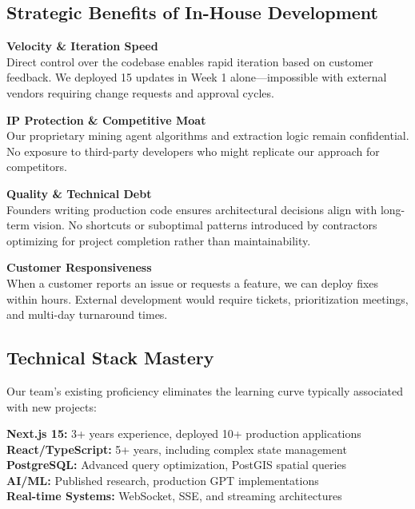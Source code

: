\documentclass[11pt]{article}
\begin{document}
\subsection{Strategic Benefits of In-House Development}

\textbf{Velocity \& Iteration Speed}\\
Direct control over the codebase enables rapid iteration based on customer feedback. We deployed 15 updates in Week 1 alone—impossible with external vendors requiring change requests and approval cycles.

\textbf{IP Protection \& Competitive Moat}\\
Our proprietary mining agent algorithms and extraction logic remain confidential. No exposure to third-party developers who might replicate our approach for competitors.

\textbf{Quality \& Technical Debt}\\
Founders writing production code ensures architectural decisions align with long-term vision. No shortcuts or suboptimal patterns introduced by contractors optimizing for project completion rather than maintainability.

\textbf{Customer Responsiveness}\\
When a customer reports an issue or requests a feature, we can deploy fixes within hours. External development would require tickets, prioritization meetings, and multi-day turnaround times.

\subsection{Technical Stack Mastery}

Our team's existing proficiency eliminates the learning curve typically associated with new projects:

\begin{highlight}
\faCheckCircle \quad \textbf{Next.js 15:} 3+ years experience, deployed 10+ production applications\\
\faCheckCircle \quad \textbf{React/TypeScript:} 5+ years, including complex state management\\
\faCheckCircle \quad \textbf{PostgreSQL:} Advanced query optimization, PostGIS spatial queries\\
\faCheckCircle \quad \textbf{AI/ML:} Published research, production GPT implementations\\
\faCheckCircle \quad \textbf{Real-time Systems:} WebSocket, SSE, and streaming architectures
\end{highlight}
\end{document}
